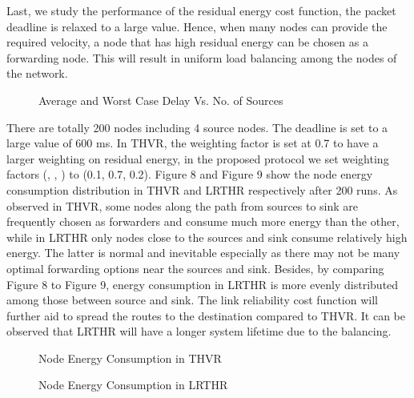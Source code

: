 \documentclass[fleqn,twoside]{article}
\begin{document}
Last, we study the performance of the residual energy cost function, the packet deadline is relaxed to a large value. Hence, when many
nodes can provide the required velocity, a node that has high residual energy can be chosen as a forwarding node. This will result in uniform load balancing among the nodes of the network.


\begin{figure}
\begin{center}
\begin{small}
\caption{Average and Worst Case Delay Vs. No. of Sources}
\end{small}
\end{center}
\end{figure}

There are totally 200 nodes including 4 source nodes. The deadline is set to a large value of 600 ms. In THVR, the weighting factor  
is set at 0.7 to have a larger weighting on residual energy, in the proposed protocol we set weighting factors (, , ) to (0.1, 0.7, 0.2). Figure 8 and Figure 9 show the node energy consumption distribution in THVR and LRTHR respectively after 200 runs. 
As observed in THVR, some nodes along the path from
sources to sink are frequently chosen as forwarders and consume much more energy than the other, while in LRTHR only nodes close to the sources and sink consume relatively high energy. The latter is normal and inevitable especially as there may not be many optimal forwarding options near the sources and sink. Besides, by comparing Figure 8 to Figure 9, energy consumption in LRTHR is more evenly distributed among those between source and sink. The link reliability cost function will further aid to spread the routes to the destination compared to THVR. It can be observed that LRTHR will have a longer system lifetime due to the balancing.



\begin{figure}
\begin{center}
\begin{small}
\caption{Node Energy Consumption in THVR}
\end{small}
\end{center}
\end{figure}

\begin{figure}
\begin{center}
\begin{small}
\caption{Node Energy Consumption in LRTHR}
\end{small}
\end{center}
\end{figure}
\end{document}
